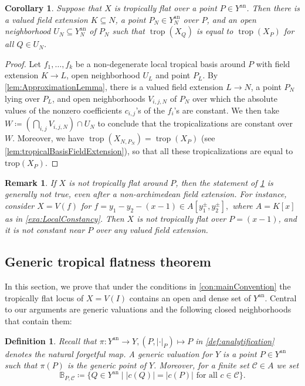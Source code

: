 \documentclass[12pt,reqno,a4paper]{amsart}
\theoremstyle{theoremstyle}
\newtheorem{corollary}[theorem]{Corollary}
\theoremstyle{examplestyle}
\newtheorem{definition}[theorem]{Definition}
\newtheorem{remark}[theorem]{Remark}
\theoremstyle{algorithmstyle}
\newcommand{\an}{{\mathrm{an}}}
\DeclareMathOperator{\Trop}{trop}
\begin{document}
\begin{corollary}\label{cor:TropicallyFlatImpliesConstant}
  Suppose that $X$ is tropically flat over a point $P\in Y^{\an}$. Then there is a valued field extension $K\subseteq N$, a point $P_{N}\in Y^\an_N$ over $P$, and an open neighborhood $U_{N}\subseteq Y^{\an}_{N}$ of $P_{N}$ such that $\Trop(X_{Q})$ is equal to $\Trop(X_{P})$ %
  for all $Q\in U_{N}$. %
%
\end{corollary}
\begin{proof}
  Let $f_{1},\dots,f_{k}$ be a non-degenerate local tropical basis around $P$ with field extension $K\to  L$, open neighborhood $U_{L}$ and point $P_{L}$. By \cref{lem:ApproximationLemma}, there is a valued field extension $L\to N$, a point $P_{N}$ lying over $P_{L}$, and open neighborhoods $V_{i,j,N}$ of $P_{N}$ over which the absolute values of the nonzero coefficients $c_{i,j}$'s of the $f_{i}$'s are constant. %
  We then take $W\coloneqq(\bigcap_{i,j} V_{i,j,N})\cap U_{N}$  to conclude that the tropicalizations are constant over $W$. Moreover, we have %
  $\Trop(X_{N,P_{N}})=\Trop(X_{P})$ (see \cref{lem:tropicalBasisFieldExtension}), so that all these tropicalizations are equal to  %
  $\mathrm{trop}(X_{P})$.
\end{proof}
\begin{remark}
   If $X$ is not tropically flat around $P$, then the statement of \cref{cor:TropicallyFlatImpliesConstant} is generally not true, even after a non-archimedean field extension. For instance, consider $X=V(f)$ for $f=y_{1}-y_{2}-(x-1)\in A[y_{1}^{\pm},y_{2}^{\pm}],$ where $A=K[x]$ as in \cref{exa:LocalConstancy}. Then $X$ is not tropically flat over $P=(x-1)$, and it is not constant near $P$ over any valued field extension. %
\end{remark}


\subsection{Generic tropical flatness theorem}

In this section, we prove that under the conditions in \cref{con:mainConvention} the tropically flat locus of $X=V(I)$ contains an open and dense set of $Y^\an$.  Central to our arguments are generic valuations and the following closed neighborhoods that contain them:

\begin{definition}\label{def:GenericValuation}
  Recall that $\pi\colon Y^\an\rightarrow Y, (P,|\cdot|_P)\mapsto P$ in \cref{def:analytification} denotes the natural forgetful map. A \emph{generic valuation} for $Y$ is a point $P\in Y^{\mathrm{an}}$ such that $\pi(P)$ is the generic point of $Y$.  Moreover, for a finite set $\mathcal C\in A$ we set
  \begin{equation*}
    \mathbb{B}_{P,\mathcal{C}}\coloneqq \{Q\in Y^{\an}\mid |c(Q)|=|c(P)| \text{ for all } c\in\mathcal C\}.
  \end{equation*}
\end{definition}
\end{document}
